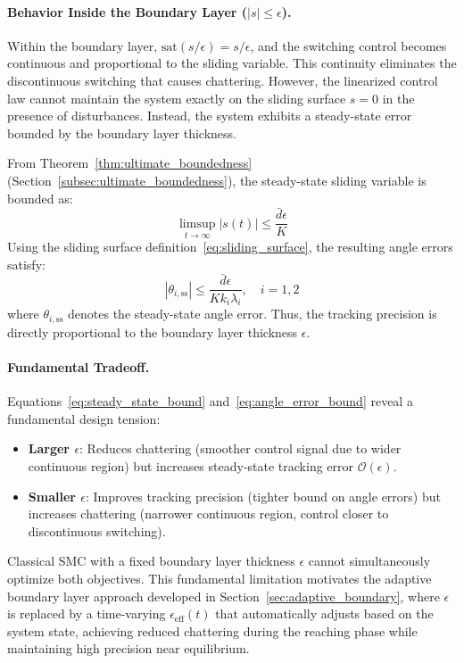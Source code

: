 \paragraph{Behavior Inside the Boundary Layer ($|s| \leq \epsilon$).}
Within the boundary layer, $\text{sat}(s/\epsilon) = s/\epsilon$, and the switching control becomes continuous and proportional to the sliding variable. This continuity eliminates the discontinuous switching that causes chattering. However, the linearized control law cannot maintain the system exactly on the sliding surface $s = 0$ in the presence of disturbances. Instead, the system exhibits a steady-state error bounded by the boundary layer thickness.

From Theorem~\ref{thm:ultimate_boundedness} (Section~\ref{subsec:ultimate_boundedness}), the steady-state sliding variable is bounded as:
\begin{equation}
\label{eq:steady_state_bound}
\limsup_{t \to \infty} |s(t)| \leq \frac{\bar{d} \epsilon}{K}
\end{equation}
Using the sliding surface definition~\eqref{eq:sliding_surface}, the resulting angle errors satisfy:
\begin{equation}
\label{eq:angle_error_bound}
|\theta_{i,\text{ss}}| \leq \frac{\bar{d} \epsilon}{K k_i \lambda_i}, \quad i = 1, 2
\end{equation}
where $\theta_{i,\text{ss}}$ denotes the steady-state angle error. Thus, the tracking precision is directly proportional to the boundary layer thickness $\epsilon$.

\paragraph{Fundamental Tradeoff.}
Equations~\eqref{eq:steady_state_bound} and~\eqref{eq:angle_error_bound} reveal a fundamental design tension:
\begin{itemize}
    \item \textbf{Larger $\epsilon$}: Reduces chattering (smoother control signal due to wider continuous region) but increases steady-state tracking error $\mathcal{O}(\epsilon)$.
    \item \textbf{Smaller $\epsilon$}: Improves tracking precision (tighter bound on angle errors) but increases chattering (narrower continuous region, control closer to discontinuous switching).
\end{itemize}

Classical SMC with a fixed boundary layer thickness $\epsilon$ cannot simultaneously optimize both objectives. This fundamental limitation motivates the adaptive boundary layer approach developed in Section~\ref{sec:adaptive_boundary}, where $\epsilon$ is replaced by a time-varying $\epsilon_{\text{eff}}(t)$ that automatically adjusts based on the system state, achieving reduced chattering during the reaching phase while maintaining high precision near equilibrium.


